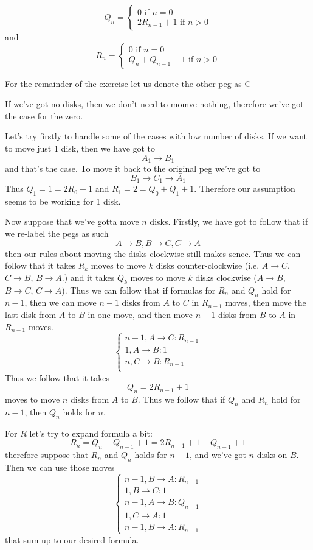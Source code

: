 \documentclass[11pt,oneside,titlepage]{book}
\begin{document}
$$Q_n =
\begin{cases}
  0 \text{ if } n = 0 \\
  2R_{n - 1}  + 1 \text{ if } n > 0
\end{cases}
$$
and
$$R_n =
\begin{cases}
  0 \text{ if } n = 0 \\
  Q_n + Q_{n - 1} + 1 \text{ if } n > 0
\end{cases}
$$

For the remainder of the exercise let us denote the other peg as C

If we've got no disks, then we don't need to momve nothing, therefore we've got the case for the
zero.

Let's try firstly to handle some of the cases with low number of disks. If we want to move
just 1 disk, then we have got to
$$A_1 \to B_1$$
and that's the case. To move it back to the original peg we've got to
$$B_1 \to C_1 \to A_1$$ 
Thus $Q_1 = 1 = 2R_0 + 1$ and
$R_1 = 2 = Q_0 + Q_1 + 1$. Therefore our assumption seems to be working
for 1 disk.

Now suppose that we've gotta move $n$ disks. Firstly, we have got to follow that
if we  re-label the pegs as such
$$A \to B, B \to C, C \to A$$
then our rules about moving the disks clockwise  still makes sence. Thus we can follow that
it takes $R_{k}$ moves to move $k$ disks counter-clockwise (i.e. $A \to C$, $C \to B$,
$B \to A$.) and it takes $Q_k$ moves to move $k$ disks clockwise ($A \to B$, $B \to C$, $C \to A$).
Thus we can follow that if formulas for $R_n$ and $Q_n$ hold for $n - 1$, then we
can move $n - 1$ disks from $A$ to $C$ in $R_{n - 1}$ moves, then move the last disk from
$A$ to $B$ in one move, and then move $n - 1$ disks from $B$ to $A$ in $R_{n - 1}$ moves.
$$
\begin{cases}
n - 1, A \to C: R_{n - 1}\\
1, A \to B: 1\\
n, C \to B: R_{n - 1}\\  
\end{cases}
$$
Thus we follow that it takes
$$Q_n = 2R_{n - 1} + 1$$
moves to move $n$ disks from $A$ to $B$. Thus we follow that if $Q_n$ and $R_n$ hold for
$n - 1$, then $Q_n$ holds for $n$. 

For $R$ let's try to expand formula a bit:
$$R_n = Q_n + Q_{n - 1} + 1 = 2R_{n - 1} + 1 + Q_{n - 1} + 1$$
therefore suppose that $R_n$ and $Q_n$ holds for $n - 1$, and we've got $n$ disks on $B$.
Then we can use those moves
$$
\begin{cases}
  n - 1, B \to A: R_{n - 1} \\
  1, B \to C: 1 \\
  n - 1, A \to B: Q_{n - 1} \\
  1, C \to A: 1 \\
  n - 1, B \to A: R_{n - 1}
\end{cases}
$$
that sum up to our desired formula.
\end{document}

